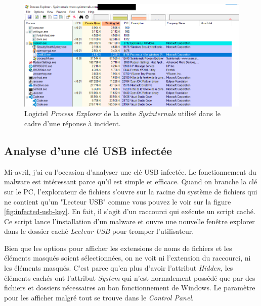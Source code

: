 \begin{figure}
    \centering
    \includegraphics[width=0.99\linewidth]{images/incident-response/IR-process-explorer.png}
    \caption{Logiciel \textit{Process Explorer} de la suite \textit{Sysinternals} utilisé dans le cadre d'une réponse à incident.}
    \label{fig:process-explorer}
\end{figure}



\subsection{Analyse d'une clé USB infectée}

Mi-avril, j'ai eu l'occasion d'analyser une clé USB infectée. Le fonctionnement du malware est intéressant parce qu'il est simple et efficace. Quand on branche la clé sur le PC, l'explorateur de fichiers s'ouvre sur la racine du système de fichiers qui ne contient qu'un "Lecteur USB" comme vous pouvez le voir sur la figure \ref{fig:infected-usb-key}. En fait, il s'agit d'un raccourci qui exécute un script caché. Ce script lance l'installation d'un malware et ouvre une nouvelle fenêtre explorer dans le dossier caché \textit{Lecteur USB} pour tromper l'utilisateur.

Bien que les options pour afficher les extensions de noms de fichiers et les éléments masqués soient sélectionnées, on ne voit ni l'extension du raccourci, ni les éléments masqués. C'est parce qu'en plus d'avoir l'attribut \textit{Hidden}, les éléments cachés ont l'attribut \textit{System} qui n'est normalement possédé que par des fichiers et dossiers nécessaires au bon fonctionnement de Windows. Le paramètre pour les afficher malgré tout se trouve dans le \textit{Control Panel}.

